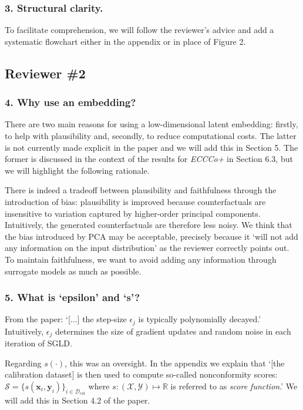 \documentclass[letterpaper]{article} %
\begin{document}
\subsubsection{3. Structural clarity.} 

To facilitate comprehension, we will follow the reviewer's advice and add a systematic flowchart either in the appendix or in place of Figure 2.

\subsection*{Reviewer \#2}

\subsubsection{4. Why use an embedding?}

There are two main reasons for using a low-dimensional latent embedding: firstly, to help with plausibility and, secondly, to reduce computational costs. The latter is not currently made explicit in the paper and we will add this in Section 5. The former is discussed in the context of the results for \textit{ECCCo+} in Section 6.3, but we will highlight the following rationale. 

There is indeed a tradeoff between plausibility and faithfulness through the introduction of bias: plausibility is improved because counterfactuals are insensitive to variation captured by higher-order principal components. Intuitively, the generated counterfactuals are therefore less noisy. We think that the bias introduced by PCA may be acceptable, precisely because it `will not add any information on the input distribution' as the reviewer correctly points out. To maintain faithfulness, we want to avoid adding any information through surrogate models as much as possible.

\subsubsection{5. What is `epsilon' and `s'?}

From the paper: `[...] the step-size $\epsilon_j$ is typically polynomially decayed.' Intuitively, $\epsilon_j$ determines the size of gradient updates and random noise in each iteration of SGLD.

Regarding $s(\cdot)$, this was an oversight. In the appendix we explain that `[the calibration dataset] is then used to compute so-called nonconformity scores: $\mathcal{S}=\{s(\mathbf{x}_i,\mathbf{y}_i)\}_{i \in \mathcal{D}_{\text{cal}}}$ where $s: (\mathcal{X},\mathcal{Y}) \mapsto \mathbb{R}$ is referred to as \textit{score function}.' We will add this in Section 4.2 of the paper. 
\end{document}
